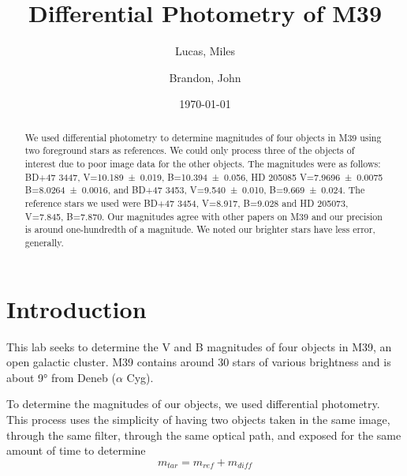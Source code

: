 \documentclass[%
aip,
jmp,
reprint,
floatfix
]{revtex4-1}
\begin{document}
	\title[Photometry of M39]{Differential Photometry of M39}

	\author{Lucas, Miles}
	\author{Brandon, John}

	\date{\today}



	\begin{abstract}
	We used differential photometry to determine magnitudes of four objects in M39 using two foreground stars as references. We could only process three of the objects of interest due to poor image data for the other objects. The magnitudes were as follows: BD+47 3447, V=\SI{10.189\pm0.019}{}, B=\SI{10.394\pm0.056}{}, HD 205085  V=\SI{7.9696\pm0.0075}{} B=\SI{8.0264\pm0.0016}{}, and BD+47 3453, V=\SI{9.540\pm.010}{}, B=\SI{9.669\pm0.024}{}. The reference stars we used were BD+47 3454, V=\SI{8.917}{}, B=\SI{9.028}{} and HD 205073, V=\SI{7.845}{}, B=\SI{7.870}{}. Our magnitudes agree with other papers on M39 and our precision is around one-hundredth of a magnitude. We noted our brighter stars have less error, generally.

	\end{abstract}

	\maketitle


	\section{Introduction}

	This lab seeks to determine the V and B magnitudes of four objects in M39, an open galactic cluster. M39 contains around 30 stars of various brightness and is about \ang{9} from Deneb ($\alpha$ Cyg). 
	
	To determine the magnitudes of our objects, we used differential photometry. This process uses the simplicity of having two objects taken in the same image, through the same filter, through the same optical path, and exposed for the same amount of time to determine
	\begin{equation}
		m_{tar} = m_{ref} + m_{diff}
		\label{eqn:diff}
	\end{equation}
	
\end{document}
